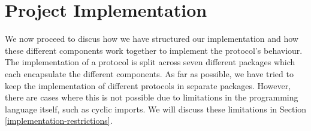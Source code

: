 \documentclass[12pt,twoside]{report}
\begin{document}










\section{Project Implementation}\label{project-structure}

We now proceed to discus how we have structured our implementation and how these different components work together to implement the protocol's behaviour. The implementation of a protocol is split across seven different packages which each encapsulate the different components. As far as possible, we have tried to keep the implementation of different protocols in separate packages. However, there are cases where this is not possible due to limitations in the programming language itself, such as cyclic imports. We will discuss these limitations in Section \ref{implementation-restrictions}.
\end{document}
